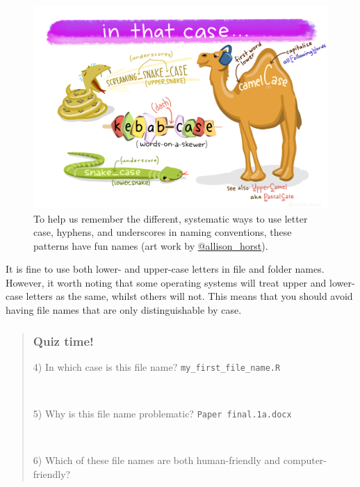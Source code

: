 \documentclass[
  letterpaper,
  DIV=11,
  numbers=noendperiod]{scrreprt}
\begin{document}
\begin{figure}[H]

{\centering \includegraphics{images/AHorst_InThatCase.png}

}

\caption{To help us remember the different, systematic ways to use
letter case, hyphens, and underscores in naming conventions, these
patterns have fun names (art work by
\href{https://allisonhorst.com/allison-horst}{@allison\_horst}).}

\end{figure}%

It is fine to use both lower- and upper-case letters in file and folder
names. However, it worth noting that some operating systems will treat
upper and lower-case letters as the same, whilst others will not. This
means that you should avoid having file names that are only
distinguishable by case.

\begin{quote}
\subsubsection*{Quiz time!}\label{quiz-time-1}

4) In which case is this file name? \texttt{my\_first\_file\_name.R}

~

5) Why is this file name problematic? \texttt{Paper\ final.1a.docx}

~

6) Which of these file names are both human-friendly and
computer-friendly?
\end{quote}
\end{document}
